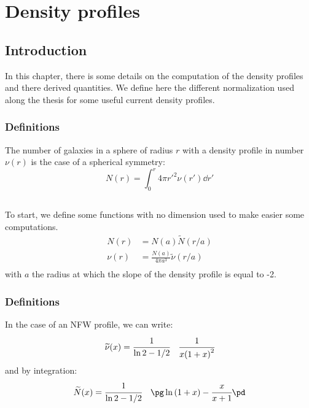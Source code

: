 \chapter{Density profiles}

\section{Introduction}

In this chapter, there is some details on the computation of the
density profiles and there derived quantities. We define here the different
normalization used along the thesis for some useful current density profiles.

\subsection{Definitions}

The number of galaxies in a sphere of radius $r$ with a density profile in
number $\nu(r)$ is the case of a spherical symmetry:
\begin{equation}
    N(r)=\int_0^r4\pi {r'}^2 \nu(r')\dd{r'}
\end{equation}

\section{\citet{NFW97}}

To start, we define some functions with no dimension used to make easier
some computations.
\begin{align*}
        N(r)&={N(a)}{\widetilde{N}{(r/a)}}\\
        \nu(r)&=\frac{N(a)}{4\pi{a^3}}\widetilde{\nu}{(r/a)}\\
\end{align*}
with $a$ the radius at which the slope of the density profile is equal to -2.

\subsection{Definitions}
In the case of an NFW profile, we can write:
\[
    \widetilde{\nu}(x)=\cfrac{1}{\ln2-1/2}\quad\cfrac{1}{x{(1+x)}^2}
\]
and by integration:
\[
    \widetilde{N}(x)=\cfrac{1}{\ln2-1/2}\quad{\pg\ln{(1+x)}-\cfrac{x}{x+1}\pd}
\]

